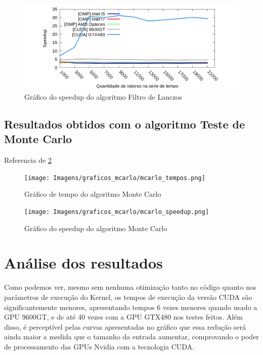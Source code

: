 \begin{figure}[H]
\centering
\includegraphics[width=1.0\textwidth]{Imagens/graficos_lanczos/lanczos_speedup.png}
\caption{Gráfico do speedup do algoritmo Filtro de Lanczos}
\label{fig:grafico_speedup_lanczos}
\end{figure}

\subsection{Resultados obtidos com o algoritmo Teste de Monte Carlo}

Referencia de \ref{fig:grafico_tempo_mcarlo}

\begin{figure}[H]
\centering
\texttt{[image: Imagens/graficos\_mcarlo/mcarlo\_tempos.png]}
\caption{Gráfico de tempo do algoritmo Monte Carlo}
\label{fig:grafico_tempo_mcarlo}
\end{figure}

\begin{figure}[H]
\centering
\texttt{[image: Imagens/graficos\_mcarlo/mcarlo\_speedup.png]}
\caption{Gráfico do speedup do algoritmo Monte Carlo}
\label{fig:grafico_speedup_mcarlo}
\end{figure}

\section{Análise dos resultados}

Como podemos ver, mesmo sem nenhuma otimização tanto no código quanto nos parâmetros de execução do Kernel, os tempos de execução da versão CUDA são significantemente menores, apresentando tempos 6 vezes menores quando usado a GPU 9600GT, e de até 40 vezes com a GPU GTX480 nos testes feitos. Além disso, é perceptível pelas curvas apresentadas no gráfico que essa redução será ainda maior a medida que o tamanho da entrada aumentar, comprovando o poder de processamento das GPUs Nvidia com a tecnologia CUDA.